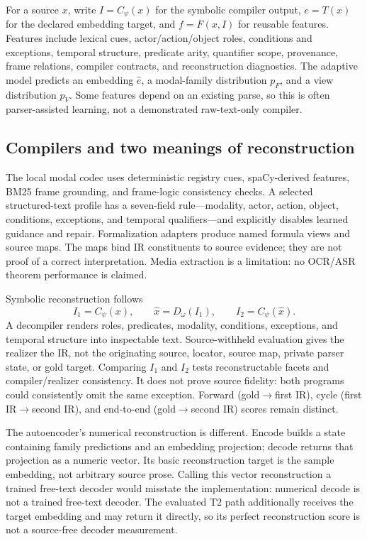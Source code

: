 \documentclass{article}
\begin{document}
For a source $x$, write $I=C_\psi(x)$ for the symbolic compiler output, $e=T(x)$ for the declared embedding target, and $f=F(x,I)$ for reusable features. Features include lexical cues, actor/action/object roles, conditions and exceptions, temporal structure, predicate arity, quantifier scope, provenance, frame relations, compiler contracts, and reconstruction diagnostics. The adaptive model predicts an embedding $\hat e$, a modal-family distribution $p_F$, and a view distribution $p_V$. Some features depend on an existing parse, so this is often parser-assisted learning, not a demonstrated raw-text-only compiler.

\subsection{Compilers and two meanings of reconstruction}
The local modal codec uses deterministic registry cues, spaCy-derived features, BM25 frame grounding, and frame-logic consistency checks. A selected structured-text profile has a seven-field rule---modality, actor, action, object, conditions, exceptions, and temporal qualifiers---and explicitly disables learned guidance and repair. Formalization adapters produce named formula views and source maps. The maps bind IR constituents to source evidence; they are not proof of a correct interpretation. Media extraction is a limitation: no OCR/ASR theorem performance is claimed.



Symbolic reconstruction follows
\begin{equation}
I_1=C_\psi(x),\qquad \hat{x}=D_\omega(I_1),\qquad I_2=C_\psi(\hat{x}).
\label{eq:cycle}
\end{equation}
A decompiler renders roles, predicates, modality, conditions, exceptions, and temporal structure into inspectable text. Source-withheld evaluation gives the realizer the IR, not the originating source, locator, source map, private parser state, or gold target. Comparing $I_1$ and $I_2$ tests reconstructable facets and compiler/realizer consistency. It does not prove source fidelity: both programs could consistently omit the same exception. Forward (gold$\to$first IR), cycle (first IR$\to$second IR), and end-to-end (gold$\to$second IR) scores remain distinct.

The autoencoder's numerical reconstruction is different. Encode builds a state containing family predictions and an embedding projection; decode returns that projection as a numeric vector. Its basic reconstruction target is the sample embedding, not arbitrary source prose. Calling this vector reconstruction a trained free-text decoder would misstate the implementation: numerical decode is not a trained free-text decoder. The evaluated T2 path additionally receives the target embedding and may return it directly, so its perfect reconstruction score is not a source-free decoder measurement.
\end{document}
